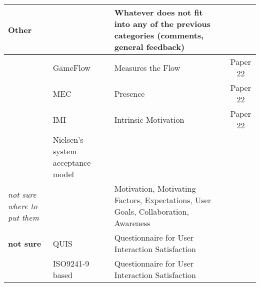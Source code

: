 \begin{tabular}{p{3.5cm}p{5cm}p{6cm}c}
\textbf{Other} &  & Whatever does not fit into any of the previous categories (comments, general feedback) &    \\ \hline

& GameFlow & Measures the Flow & Paper 22  \\
& MEC & Presence & Paper 22   \\
& IMI & Intrinsic Motivation & Paper 22  \\
& Nielsen's system acceptance model & & \cite{ojala2010ubi}  \\



\textit{not sure where to put them} &  & Motivation, Motivating Factors, Expectations, User Goals, Collaboration, Awareness
 &    \\ \hline


\textbf{not sure} & QUIS  & Questionnaire for User Interaction Satisfaction  &   \\
& ISO9241-9 based  & Questionnaire for User Interaction Satisfaction  &   \\


\bottomrule
\end{tabular}

